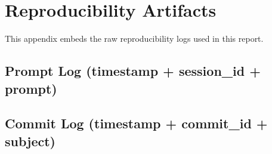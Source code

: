 \documentclass[11pt]{article}
\begin{document}
\appendix
\section{Reproducibility Artifacts}
This appendix embeds the raw reproducibility logs used in this report.

\subsection{Prompt Log (timestamp + session\_id + prompt)}

\subsection{Commit Log (timestamp + commit\_id + subject)}
\end{document}
